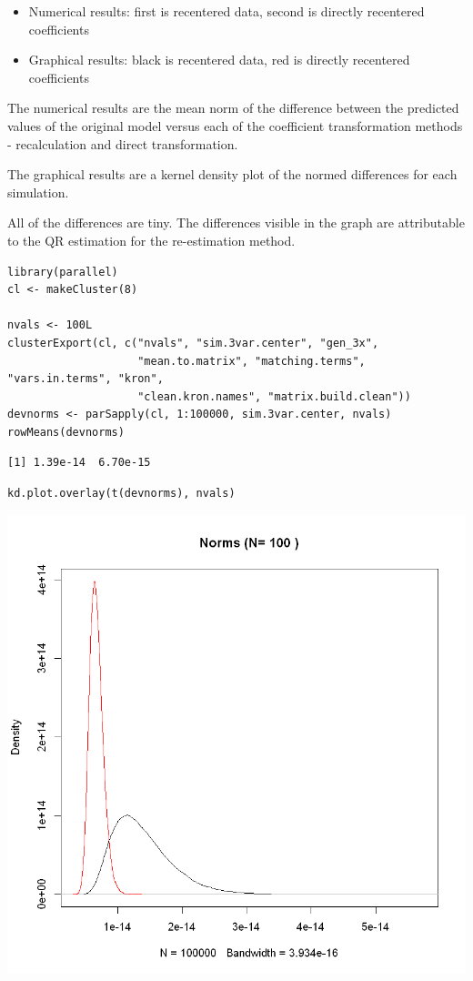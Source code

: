 \documentclass[]{article}
\providecommand{\tightlist}{%
  \setlength{\itemsep}{0pt}\setlength{\parskip}{0pt}}
\begin{document}
\begin{itemize}
\tightlist
\item
  Numerical results: first is recentered data, second is directly
  recentered coefficients
\item
  Graphical results: black is recentered data, red is directly
  recentered coefficients
\end{itemize}

The numerical results are the mean norm of the difference between the
predicted values of the original model versus each of the coefficient
transformation methods - recalculation and direct transformation.

The graphical results are a kernel density plot of the normed
differences for each simulation.

All of the differences are tiny. The differences visible in the graph
are attributable to the QR estimation for the re-estimation method.

\begin{verbatim}
library(parallel)
cl <- makeCluster(8)

nvals <- 100L
clusterExport(cl, c("nvals", "sim.3var.center", "gen_3x", 
                    "mean.to.matrix", "matching.terms", "vars.in.terms", "kron",
                    "clean.kron.names", "matrix.build.clean"))
devnorms <- parSapply(cl, 1:100000, sim.3var.center, nvals)
rowMeans(devnorms)
\end{verbatim}

\begin{verbatim}
[1] 1.39e-14  6.70e-15
\end{verbatim}

\begin{verbatim}
kd.plot.overlay(t(devnorms), nvals)
\end{verbatim}

\includegraphics{errors/output_6_1.png}
\end{document}
